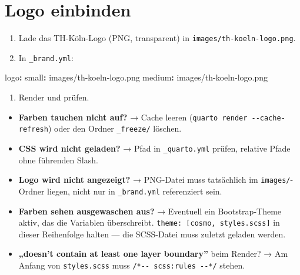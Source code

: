 \documentclass[
  ngerman,
  a4paper,
  DIV=11]{scrreprt}
\newenvironment{Shaded}{\begin{snugshade}}{\end{snugshade}}
\newcommand{\AttributeTok}[1]{\textcolor[rgb]{0.40,0.45,0.13}{#1}}
\newcommand{\FunctionTok}[1]{\textcolor[rgb]{0.28,0.35,0.67}{#1}}
\newcommand{\KeywordTok}[1]{\textcolor[rgb]{0.00,0.23,0.31}{\textbf{#1}}}
\providecommand{\tightlist}{%
  \setlength{\itemsep}{0pt}\setlength{\parskip}{0pt}}
\begin{document}
\section{Logo einbinden}\label{logo-einbinden}

\begin{enumerate}
\def\labelenumi{\arabic{enumi}.}
\tightlist
\item
  Lade das TH-Köln-Logo (PNG, transparent) in
  \texttt{images/th-koeln-logo.png}.
\item
  In \texttt{\_brand.yml}:
\end{enumerate}

\begin{Shaded}
\begin{Highlighting}[]
\FunctionTok{logo}\KeywordTok{:}
\AttributeTok{  }\FunctionTok{small}\KeywordTok{:}\AttributeTok{ images/th{-}koeln{-}logo.png}
\AttributeTok{  }\FunctionTok{medium}\KeywordTok{:}\AttributeTok{ images/th{-}koeln{-}logo.png}
\end{Highlighting}
\end{Shaded}

\begin{enumerate}
\def\labelenumi{\arabic{enumi}.}
\setcounter{enumi}{2}
\tightlist
\item
  Render und prüfen.
\end{enumerate}

\begin{tcolorbox}[enhanced jigsaw, opacitybacktitle=0.6, leftrule=.75mm, title=\textcolor{quarto-callout-warning-color}{\faExclamationTriangle}\hspace{0.5em}{Was, wenn \ldots{}}, colframe=quarto-callout-warning-color-frame, arc=.35mm, toprule=.15mm, colbacktitle=quarto-callout-warning-color!10!white, bottomrule=.15mm, colback=white, rightrule=.15mm, breakable, toptitle=1mm, bottomtitle=1mm, opacityback=0, titlerule=0mm, coltitle=black, left=2mm]

\begin{itemize}
\tightlist
\item
  \textbf{Farben tauchen nicht auf?} → Cache leeren
  (\texttt{quarto\ render\ -\/-cache-refresh}) oder den Ordner
  \texttt{\_freeze/} löschen.
\item
  \textbf{CSS wird nicht geladen?} → Pfad in \texttt{\_quarto.yml}
  prüfen, relative Pfade ohne führenden Slash.
\item
  \textbf{Logo wird nicht angezeigt?} → PNG-Datei muss tatsächlich im
  \texttt{images/}-Ordner liegen, nicht nur in \texttt{\_brand.yml}
  referenziert sein.
\item
  \textbf{Farben sehen ausgewaschen aus?} → Eventuell ein
  Bootstrap-Theme aktiv, das die Variablen überschreibt.
  \texttt{theme:\ {[}cosmo,\ styles.scss{]}} in dieser Reihenfolge
  halten --- die SCSS-Datei muss zuletzt geladen werden.
\item
  \textbf{„doesn't contain at least one layer boundary''} beim Render? →
  Am Anfang von \texttt{styles.scss} muss
  \texttt{/*-\/-\ scss:rules\ -\/-*/} stehen.
\end{itemize}

\end{tcolorbox}
\end{document}
